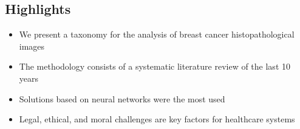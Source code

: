 \documentclass[review]{elsarticle}
\begin{document}
\begin{mdframed}
[hidealllines=true,backgroundcolor=blue!20]
\section*{Highlights}

\begin{itemize}
\item We present a taxonomy for the analysis of breast cancer histopathological images 
\end{itemize}

\begin{itemize}
\item The methodology consists of a systematic literature review of the last 10 years 
\end{itemize}

\begin{itemize}
\item Solutions based on neural networks were the most used
\end{itemize}

\begin{itemize}
\item Legal, ethical, and moral challenges are key factors for healthcare systems
\end{itemize}

\end{mdframed}
\end{document}
